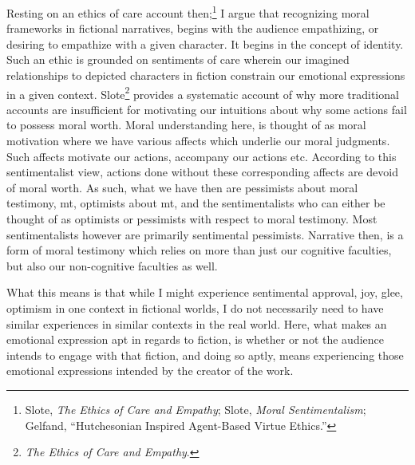 \documentclass[phdthesis,12pt,final,a4paper]{wuthesis}
\theoremstyle{definition}
\theoremstyle{definition}
\theoremstyle{definition}
\theoremstyle{definition}
\theoremstyle{remark}
\begin{document}
Resting on an ethics of care account then;\footnote{Slote, \emph{The {Ethics} of {Care} and {Empathy}}; Slote, \emph{Moral {Sentimentalism}}; Gelfand, {``Hutchesonian Inspired Agent-Based Virtue Ethics.''}} I argue that recognizing moral frameworks in fictional narratives, begins with the audience empathizing, or desiring to empathize with a given character. It begins in the concept of identity. Such an ethic is grounded on sentiments of care wherein our imagined relationships to depicted characters in fiction constrain our emotional expressions in a given context. Slote\footnote{\emph{The {Ethics} of {Care} and {Empathy}}.} provides a systematic account of why more traditional accounts are insufficient for motivating our intuitions about why some actions fail to possess moral worth. Moral understanding here, is thought of as moral motivation where we have various affects which underlie our moral judgments. Such affects motivate our actions, accompany our actions etc. According to this sentimentalist view, actions done without these corresponding affects are devoid of moral worth. As such, what we have then are pessimists about moral testimony, mt, optimists about mt, and the sentimentalists who can either be thought of as optimists or pessimists with respect to moral testimony. Most sentimentalists however are primarily sentimental pessimists. Narrative then, is a form of moral testimony which relies on more than just our cognitive faculties, but also our non-cognitive faculties as well.

What this means is that while I might experience sentimental approval, joy, glee, optimism in one context in fictional worlds, I do not necessarily need to have similar experiences in similar contexts in the real world. Here, what makes an emotional expression apt in regards to fiction, is whether or not the audience intends to engage with that fiction, and doing so aptly, means experiencing those emotional expressions intended by the creator of the work.
\end{document}
